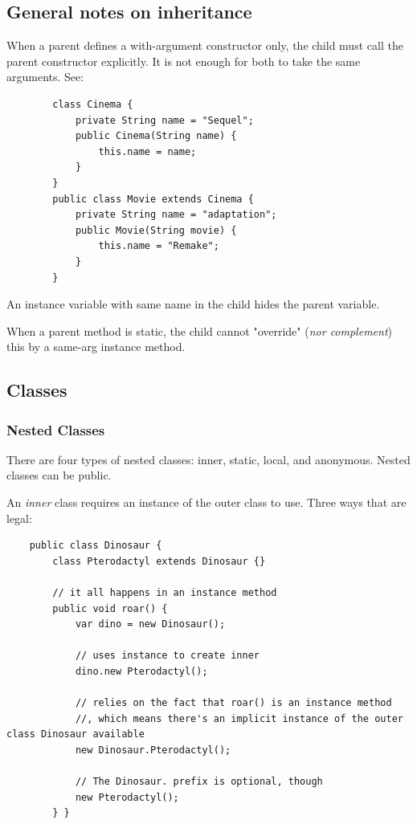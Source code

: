 \documentclass{scrartcl}
\begin{document}
\subsection{General notes on inheritance}

    When a parent defines a with-argument constructor only, the child must call the parent constructor explicitly. It is not enough for both to take the same arguments. See:

    \begin{lstlisting}
        class Cinema {
            private String name = "Sequel";
            public Cinema(String name) {
                this.name = name;
            }
        }
        public class Movie extends Cinema {
            private String name = "adaptation";
            public Movie(String movie) {
                this.name = "Remake";
            }
        }
    \end{lstlisting}

    An instance variable with same name in the child hides the parent variable.

    When a parent method is static, the child cannot "override" (\textit{nor complement}) this by a same-arg instance method.

\subsection{Classes}
\subsubsection{Nested Classes}

    There are four types of nested classes: inner, static, local, and anonymous.
    Nested classes can be public.

    An \textit{inner} class requires an instance of the outer class to use.
    Three ways that are legal:

    \begin{lstlisting}
    public class Dinosaur {
        class Pterodactyl extends Dinosaur {}

        // it all happens in an instance method
        public void roar() {
            var dino = new Dinosaur();

            // uses instance to create inner
            dino.new Pterodactyl();

            // relies on the fact that roar() is an instance method
            //, which means there's an implicit instance of the outer class Dinosaur available
            new Dinosaur.Pterodactyl();

            // The Dinosaur. prefix is optional, though
            new Pterodactyl();
        } }
    \end{lstlisting}
\end{document}
